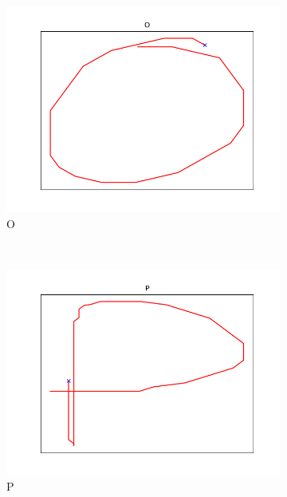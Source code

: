 \begin{figure}
\begin{subfigure}[b]{0.14\textwidth}
        \includegraphics[width=\textwidth]{images/gbem/letters_generated/O.png}
        \caption{O}
    \end{subfigure}
    ~
    \begin{subfigure}[b]{0.14\textwidth}
        \includegraphics[width=\textwidth]{images/gbem/letters_generated/P.png}
        \caption{P}
    \end{subfigure}
    ~
    \begin{subfigure}[b]{0.14\textwidth}

\end{subfigure}
\end{figure}
